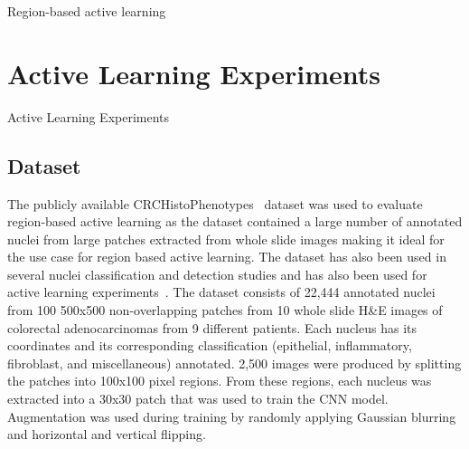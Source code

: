 \begin{algorithm}[h]
	
	\caption{Region-based active learning}
	\label{alg:regionbased}
\end{algorithm}



\section{Active Learning Experiments}
Active Learning Experiments

\subsection{Dataset}
The publicly available CRCHistoPhenotypes~\citep{sirinukunwattana2016locality} dataset was used to evaluate region-based active learning as the dataset contained a large number of annotated nuclei from large patches extracted from whole slide images making it ideal for the use case for region based active learning. The dataset has also been used in several nuclei classification and detection studies and has also been used for active learning experiments~\citep{shao2018deep}. The dataset consists of 22,444 annotated nuclei from 100 500x500 non-overlapping patches from 10 whole slide H\&E images of colorectal adenocarcinomas from 9 different patients. Each nucleus has its coordinates and its corresponding classification (epithelial, inflammatory, fibroblast, and miscellaneous) annotated. 2,500 images were produced by splitting the patches into 100x100 pixel regions. From these regions, each nucleus was extracted into a 30x30 patch that was used to train the CNN model. Augmentation was used during training by randomly applying Gaussian blurring and horizontal and vertical flipping.

